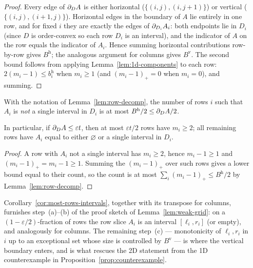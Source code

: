 \begin{proof}
Every edge of $\partial_D A$ is either horizontal ($\{(i,j),(i,j+1)\}$) or
vertical ($\{(i,j),(i+1,j)\}$). Horizontal edges in the boundary of
$A$ lie entirely in one row, and for fixed $i$ they are exactly the
edges of $\partial_{D_i} A_i$: both endpoints lie in $D_i$ (since $D$ is
order-convex so each row $D_i$ is an interval), and the indicator of
$A$ on the row equals the indicator of $A_i$. Hence summing
horizontal contributions row-by-row gives $B^{\mathrm h}$; the
analogous argument for columns gives $B^{\mathrm v}$. The second
bound follows from applying Lemma~\ref{lem:1d-components} to each
row: $2(m_i - 1) \le b_i^{\mathrm h}$ when $m_i \ge 1$ (and
$(m_i - 1)_+ = 0$ when $m_i = 0$), and summing.
\end{proof}

\begin{corollary}\label{cor:most-rows-intervals}
With the notation of Lemma~\ref{lem:row-decomp}, the number of rows
$i$ such that $A_i$ is \emph{not} a single interval in $D_i$ is at
most $B^{\mathrm h}/2 \le \partial_D A / 2$.

In particular, if $\partial_D A \le \varepsilon t$, then at most
$\varepsilon t / 2$ rows have $m_i \ge 2$; all remaining rows have
$A_i$ equal to either $\varnothing$ or a single interval in $D_i$.
\end{corollary}

\begin{proof}
A row with $A_i$ not a single interval has $m_i \ge 2$, hence $m_i -
1 \ge 1$ and $(m_i - 1)_+ = m_i - 1 \ge 1$. Summing the $(m_i-1)_+$
over such rows gives a lower bound equal to their count, so the
count is at most $\sum_i (m_i - 1)_+ \le B^{\mathrm h}/2$ by
Lemma~\ref{lem:row-decomp}.
\end{proof}

\begin{remark}\label{rem:usage}
Corollary~\ref{cor:most-rows-intervals}, together with its transpose
for columns, furnishes step~(a)--(b) of the proof sketch of
Lemma~\ref{lem:weak-grid}: on a $(1 - \varepsilon/2)$-fraction of
rows the row slice $A_i$ is an interval $[\ell_i, r_i]$ (or empty),
and analogously for columns. The remaining step~(c) ---
monotonicity of $\ell_i, r_i$ in $i$ up to an exceptional set whose
size is controlled by $B^{\mathrm v}$ --- is where the vertical
boundary enters, and is what rescues the 2D statement from the 1D
counterexample in Proposition~\ref{prop:counterexample}.
\end{remark}

